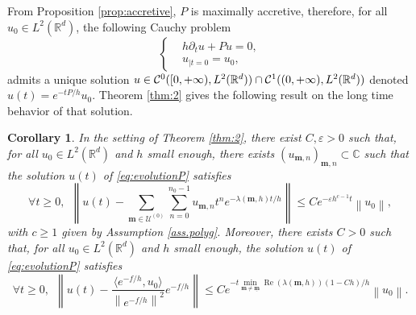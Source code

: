 \documentclass[12pt]{amsart}
\renewcommand{\Re}{\operatorname{Re}}
\newcommand{\C}{\mathbb C}
\newcommand{\R}{\mathbb R}
\def\<{\langle}
\def\>{\rangle}
\numberwithin{equation}{section}
\numberwithin{figure}{section}
\def\m{\mathbf{m}}
\def\um{\underline{\m}}
\newcommand{\vvert}[1]{\left\lVert#1\right\rVert}
\newtheorem{corollary}[defin]{Corollary}
\def\uuu{{\mathcal U}}\def\vvv{{\mathcal V}}\def\www{{\mathcal W}}\def\xxx{{\mathcal X}}
\begin{document}
From Proposition \ref{prop:accretive}, $P$ is maximally accretive, therefore, for all $u_0\in L^2(\R^d)$, the following Cauchy problem
\begin{equation}\label{eq:evolutionP}
\left\{
\begin{aligned}
    &h\partial_tu + Pu = 0,\\
    &u_{|t=0} = u_0,
\end{aligned}
\right.
\end{equation}
admits a unique solution $u\in\ccc^0([0,+\infty),L^2(\R^d))\cap\ccc^1((0,+\infty),L^2(\R^d))$ denoted $u(t) = e^{-tP/h}u_0$. Theorem \ref{thm:2} gives the following result on the long time behavior of that solution.

\begin{corollary}\label{cor:return}
    In the setting of Theorem \ref{thm:2}, there exist $C,\varepsilon>0$ %
such that, for all $u_0\in L^2(\R^d)$ and $h$ small enough, there exists $(u_{\m,n})_{\m,n}\subset\C$ such that the solution $u(t)$ of \eqref{eq:evolutionP} satisfies
    \begin{equation}\label{eq:return1}
    \forall t\geq0,\ \ \vvert{u(t) - \sum_{\m\in\uuu^{(0)}}\sum_{n=0}^{n_0-1}u_{\m,n}t^ne^{-\lambda(\m,h)t/h}} \leq Ce^{-\varepsilon h^{c-1}t}\vvert{u_0},
    \end{equation}
    with %
$c\geq1$ given by Assumption \ref{ass.polyg}. Moreover, there exists $C>0$ such that, for all $u_0\in L^2(\R^d)$ and $h$ small enough, the solution $u(t)$ of \eqref{eq:evolutionP} %
satisfies
    \begin{equation}\label{eq:return2}
    \forall t\geq 0,\ \ \vvert{u(t) - \frac{\<e^{-f/h},u_0\>}{\vvert{e^{-f/h}}^2}e^{-f/h}} \leq Ce^{-t\underset{\m\neq\um}{\min}\Re(\lambda(\m,h))(1-Ch)/h}\vvert{u_0}.
    \end{equation}
\end{corollary}
\end{document}
